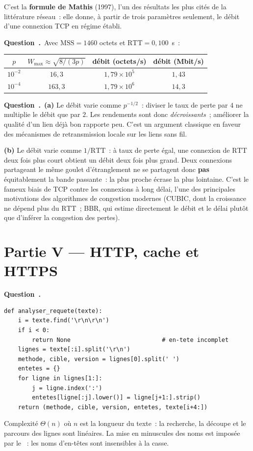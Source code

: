 \documentclass[11pt,a4paper]{article}
\renewcommand{\Q}{\medskip\par\stepcounter{qcnt}\noindent\textbf{\color{cnc}Question~\theqcnt.}~}
\begin{document}
C'est la \textbf{formule de Mathis} (1997), l'un des résultats les plus cités de la
littérature réseau~: elle donne, à partir de trois paramètres seulement, le débit d'une
connexion TCP en régime établi.

\Q Avec $\mathrm{MSS}=1460$ octets et $\mathrm{RTT}=0{,}100$~s~:
\begin{center}
\begin{tabular}{c|c|c|c}
$p$ & $W_{\max}\approx\sqrt{8/(3p)}$ & débit (octets/s) & débit (Mbit/s)\\\hline
$10^{-2}$ & $16{,}3$ & $1{,}79\times 10^{5}$ & $1{,}43$\\
$10^{-4}$ & $163{,}3$ & $1{,}79\times 10^{6}$ & $14{,}3$
\end{tabular}
\end{center}

\Q \textbf{(a)} Le débit varie comme $p^{-1/2}$~: diviser le taux de perte par $4$ ne
multiplie le débit que par $2$. Les rendements sont donc \emph{décroissants}~; améliorer la
qualité d'un lien déjà bon rapporte peu. C'est un argument classique en faveur des
mécanismes de retransmission locale sur les liens sans fil.

\textbf{(b)} Le débit varie comme $1/\mathrm{RTT}$~: à taux de perte égal, une connexion de
$\mathrm{RTT}$ deux fois plus court obtient un débit deux fois plus grand. Deux connexions
partageant le même goulet d'étranglement ne se partagent donc \textbf{pas} équitablement la
bande passante~: la plus proche écrase la plus lointaine. C'est le fameux biais de TCP contre
les connexions à long délai, l'une des principales motivations des algorithmes de congestion
modernes (CUBIC, dont la croissance ne dépend plus du $\mathrm{RTT}$~; BBR, qui estime
directement le débit et le délai plutôt que d'inférer la congestion des pertes).

\section*{Partie V --- HTTP, cache et HTTPS}

\Q
\begin{lstlisting}
def analyser_requete(texte):
    i = texte.find('\r\n\r\n')
    if i < 0:
        return None                          # en-tete incomplet
    lignes = texte[:i].split('\r\n')
    methode, cible, version = lignes[0].split(' ')
    entetes = {}
    for ligne in lignes[1:]:
        j = ligne.index(':')
        entetes[ligne[:j].lower()] = ligne[j+1:].strip()
    return (methode, cible, version, entetes, texte[i+4:])
\end{lstlisting}
Complexité $\Theta(n)$ où $n$ est la longueur du texte~: la recherche, la découpe et le
parcours des lignes sont linéaires. La mise en minuscules des noms est imposée par le
~: les noms d'en-têtes sont insensibles à la casse.
\end{document}
